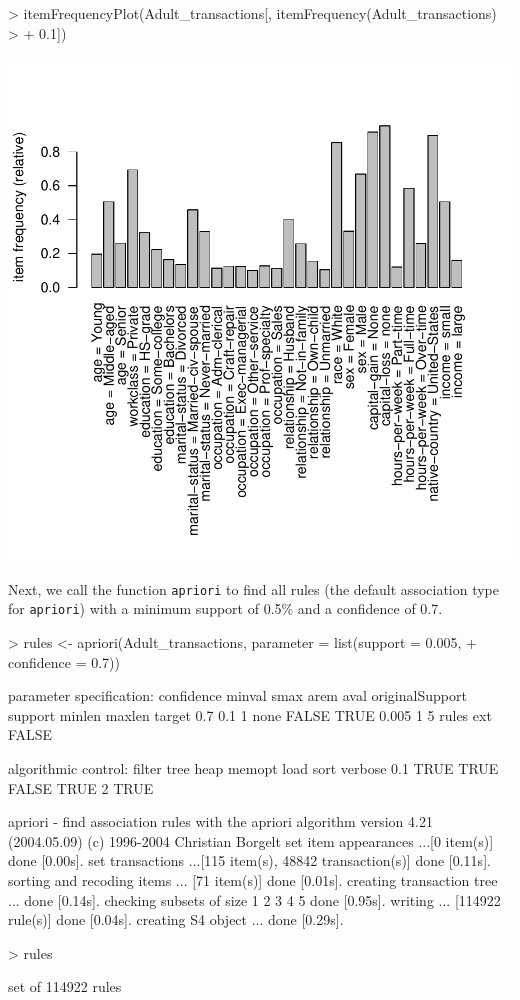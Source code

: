\documentclass[10pt,a4paper]{article}
\newcommand{\code}[1]{\texttt{#1}}
\begin{document}
\begin{Schunk}
\begin{Sinput}
> itemFrequencyPlot(Adult_transactions[, itemFrequency(Adult_transactions) > 
+     0.1])
\end{Sinput}
\end{Schunk}
\includegraphics{arules-itemFrequencyPlot}

Next, we call the function
\code{apriori} to find all rules (the default association type for
\code{apriori}) with a minimum support of 0.5\% and a confidence of 0.7.

\begin{Schunk}
\begin{Sinput}
> rules <- apriori(Adult_transactions, parameter = list(support = 0.005, 
+     confidence = 0.7))
\end{Sinput}
\begin{Soutput}
parameter specification:
 confidence minval smax arem  aval originalSupport support minlen maxlen target
        0.7    0.1    1 none FALSE            TRUE   0.005      1      5  rules
   ext
 FALSE

algorithmic control:
 filter tree heap memopt load sort verbose
    0.1 TRUE TRUE  FALSE TRUE    2    TRUE

apriori - find association rules with the apriori algorithm
version 4.21 (2004.05.09)        (c) 1996-2004   Christian Borgelt
set item appearances ...[0 item(s)] done [0.00s].
set transactions ...[115 item(s), 48842 transaction(s)] done [0.11s].
sorting and recoding items ... [71 item(s)] done [0.01s].
creating transaction tree ... done [0.14s].
checking subsets of size 1 2 3 4 5 done [0.95s].
writing ... [114922 rule(s)] done [0.04s].
creating S4 object  ... done [0.29s].
\end{Soutput}
\begin{Sinput}
> rules
\end{Sinput}
\begin{Soutput}
set of 114922 rules 
\end{Soutput}
\end{Schunk}
\end{document}
